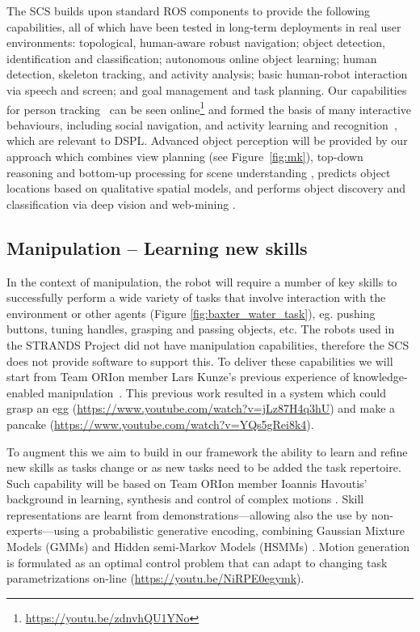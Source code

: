 \documentclass[runningheads,a4paper]{llncs}
\newcommand{\teamori}{Team ORIon}
\begin{document}
The SCS builds upon standard ROS components to provide the following capabilities, all of which have been tested in long-term deployments in real user environments: topological, human-aware robust navigation; object detection, identification and classification; autonomous online object learning; human detection, skeleton tracking, and activity analysis; basic human-robot interaction via speech and screen; and goal management and task planning. Our capabilities for person tracking~\cite{dondrup2015tracker} can be seen online\footnote{\url{https://youtu.be/zdnvhQU1YNo}} and formed the basis of many interactive behaviours, including social navigation, and activity learning and recognition~\cite{duckworth_aamas2016}, which are relevant to DSPL. Advanced object perception will be provided by our approach which combines view planning (see Figure~\ref{fig:mk}), top-down reasoning and bottom-up processing for scene understanding \cite{kunze14topdown}, predicts object locations based on qualitative spatial models\cite{kunze14bootstrapping}, and performs object discovery and classification via deep vision and web-mining \cite{aloof@icra17}.



\subsection{Manipulation -- Learning new skills}



In the context of manipulation, the robot will require a number of key skills 
to successfully perform a wide
variety of tasks that involve interaction with the environment or other
agents (Figure \ref{fig:baxter_water_task}), eg. pushing buttons, tuning handles, grasping and passing objects, etc. 
% 
The robots used in the STRANDS Project did not have manipulation capabilities, therefore the SCS does not provide software to support this. To deliver these capabilities we will start from \teamori{} member Lars Kunze's previous experience of knowledge-enabled manipulation~\cite{kunze15aij}. This previous work resulted in a system which could grasp an egg (\url{https://www.youtube.com/watch?v=jLz87H4q3hU}) and make a pancake (\url{https://www.youtube.com/watch?v=YQs5gRei8k4}). 

To augment this we aim to build in our framework the ability
to learn and refine new skills as tasks change or as new tasks need to be added
the task repertoire. Such capability will be based on \teamori{} 
member Ioannis Havoutis' background in learning, synthesis and control of 
complex motions \cite{havoutis13ijrr,Havoutis16SSRR}. Skill representations
are learnt from demonstrations---allowing also the use by non-experts---using a probabilistic generative encoding, combining Gaussian 
Mixture Models (GMMs) and Hidden semi-Markov Models (HSMMs)
\cite{Havoutis17ICRA}. Motion generation is formulated as an optimal control
problem that can adapt to changing task parametrizations on-line \cite{Zeestraten17IROS,Zeestraten2017-RAL} (\url{https://youtu.be/NiRPE0egymk}).
\end{document}
